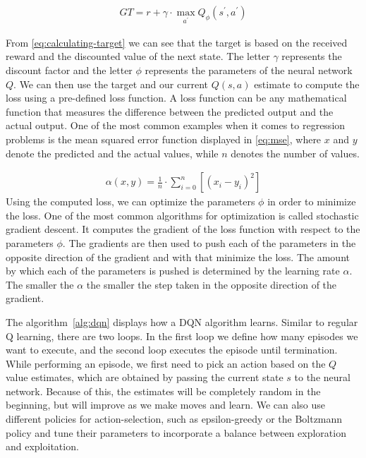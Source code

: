 \documentclass{article}
\begin{document}
\begin{align}
   \label{eq:calculating-target}
    GT = r + \gamma \cdot \max_{a^\prime} Q_{\phi}(s^\prime, a^\prime)
\end{align}

From \autoref{eq:calculating-target} we can see that the target is based on the received reward and the discounted
value of the next state.
The letter $\gamma$ represents the discount factor and the letter $\phi$ represents the parameters of the neural network $Q$.
We can then use the target and our current $Q(s,a)$ estimate to compute the loss using a pre-defined loss function.
A loss function can be any mathematical function that measures the difference between the predicted output and the
actual output.
One of the most common examples when it comes to regression problems is the mean squared error function displayed
in \autoref{eq:mse}, 
where $x$ and $y$ denote the predicted and the actual values, while $n$ denotes the number of values.

\begin{align}
   \label{eq:mse}
   \alpha(x, y) = \frac{1}{n} \cdot \sum_{i = 0}^{n} [(x_i - y_i)^2]
\end{align}
Using the computed loss, we can optimize the parameters $\phi$ in order to minimize the loss.
One of the most common algorithms for optimization is called stochastic gradient descent.
It computes the gradient of the loss function with respect to the parameters $\phi$.
The gradients are then used to push each of the parameters in the opposite direction of the gradient and with that minimize
the loss.
The amount by which each of the parameters is pushed is determined by the learning rate $\alpha$.
The smaller the $\alpha$ the smaller the step taken in the opposite direction of the gradient.

The algorithm~\ref{alg:dqn} displays how a DQN algorithm learns.
Similar to regular Q learning, there are two loops.
In the first loop we define how many episodes we want to execute, and the second loop executes the episode until termination.
While performing an episode, we first need to pick an action based on the $Q$ value estimates, which are obtained by passing the current state $s$ to the neural network.
Because of this, the estimates will be completely random in the beginning, but will improve as we make moves and learn.
We can also use different policies for action-selection, such as epsilon-greedy or the Boltzmann policy
and tune their parameters to incorporate a balance between exploration and exploitation.
\end{document}
